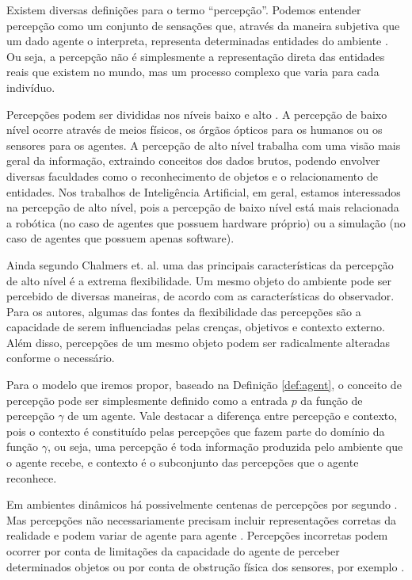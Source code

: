 Existem diversas definições para o termo ``percepção''. Podemos entender percepção como um conjunto de sensações que, através da maneira subjetiva que um dado agente o interpreta, representa determinadas entidades do ambiente \cite{gibson1950perception}. Ou seja, a percepção não é simplesmente a representação direta das entidades reais que existem no mundo, mas um processo complexo que varia para cada indivíduo.

Percepções podem ser divididas nos níveis baixo e alto \cite{chalmers1992high}. A percepção de baixo nível ocorre através de meios físicos, os órgãos ópticos para os humanos ou os sensores para os agentes. 
A percepção de alto nível trabalha com uma visão mais geral da informação, extraindo conceitos dos dados brutos, podendo envolver diversas faculdades como o reconhecimento de objetos e o relacionamento de entidades. Nos trabalhos de Inteligência Artificial, em geral, estamos interessados na percepção de alto nível, pois a percepção de baixo nível está mais relacionada a robótica (no caso de agentes que possuem hardware próprio) ou a simulação (no caso de agentes que possuem apenas software).

Ainda segundo Chalmers et. al. uma das principais características da percepção de alto nível é a extrema flexibilidade. Um mesmo objeto do ambiente pode ser percebido de diversas maneiras, de acordo com as características do observador. Para os autores, algumas das fontes da flexibilidade das percepções são a capacidade de serem influenciadas pelas crenças, objetivos e contexto externo. Além disso, percepções de um mesmo objeto podem ser radicalmente alteradas conforme o necessário.

Para o modelo que iremos propor, baseado na Definição \ref{def:agent}, o conceito de percepção pode ser simplesmente definido como a entrada $p$ da função de percepção $\gamma$ de um agente. Vale destacar a diferença entre percepção e contexto, pois o contexto é constituído pelas percepções que fazem parte do domínio da função $\gamma$, ou seja, uma percepção é toda informação produzida pelo ambiente que o agente recebe, e contexto é o subconjunto das percepções que o agente reconhece.

Em ambientes dinâmicos há possivelmente centenas de percepções por segundo \cite{hayes1992guardian}. Mas percepções não necessariamente precisam incluir representações corretas da realidade e podem variar de agente para agente \cite{janssen2005agent}. Percepções incorretas podem ocorrer por conta de limitações da capacidade do agente de perceber determinados objetos ou por conta de obstrução física dos sensores, por exemplo \cite{chrisman1991intelligent}.

